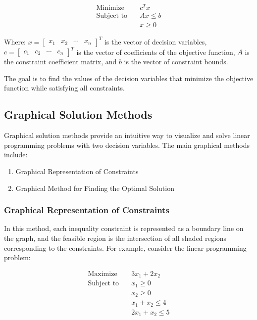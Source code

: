 \documentclass[12pt]{book} %
\begin{document}
\[
\begin{aligned}
\text{Minimize} \quad & c^Tx \\
\text{Subject to} \quad & Ax \leq b \\
& x \geq 0
\end{aligned}
\]

Where:
\( x = \begin{bmatrix} x_1 & x_2 & \cdots & x_n \end{bmatrix}^T \) is the vector of decision variables,
\( c = \begin{bmatrix} c_1 & c_2 & \cdots & c_n \end{bmatrix}^T \) is the vector of coefficients of the objective function,
\( A \) is the constraint coefficient matrix, and
\( b \) is the vector of constraint bounds.

The goal is to find the values of the decision variables that minimize the objective function while satisfying all constraints.

\subsection{Graphical Solution Methods}
Graphical solution methods provide an intuitive way to visualize and solve linear programming problems with two decision variables. The main graphical methods include:

\begin{enumerate}
    \item Graphical Representation of Constraints
    \item Graphical Method for Finding the Optimal Solution
\end{enumerate}

\subsubsection{Graphical Representation of Constraints}
In this method, each inequality constraint is represented as a boundary line on the graph, and the feasible region is the intersection of all shaded regions corresponding to the constraints. For example, consider the linear programming problem:

\[
\begin{aligned}
\text{Maximize} \quad & 3x_1 + 2x_2 \\
\text{Subject to} \quad & x_1 \geq 0 \\
& x_2 \geq 0 \\
& x_1 + x_2 \leq 4 \\
& 2x_1 + x_2 \leq 5
\end{aligned}
\]
\end{document}
